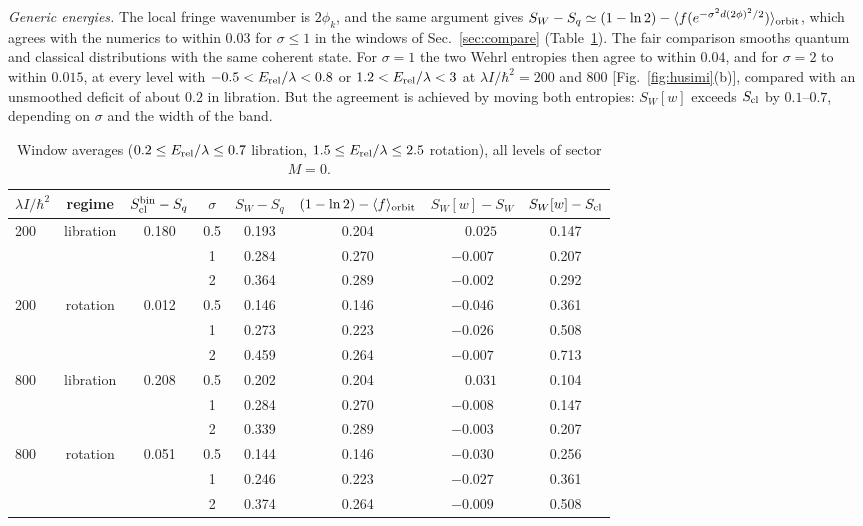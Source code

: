 \documentclass[pra,twocolumn,superscriptaddress,longbibliography,floatfix]{revtex4-2}
\newcommand{\Erel}{E_{\rm rel}}
\newcommand{\Scl}{S_{\rm cl}}
\newcommand{\SW}{S_{W}}
\begin{document}
\emph{Generic energies.} The local fringe wavenumber is $2\phi_{k}$, and the same
argument gives $\SW-S_{q}\simeq(1-\ln2)-\langle f(e^{-\sigma^{2}d(2\phi)^{2}/2})
\rangle_{\rm orbit}$, which agrees with the numerics to within $0.03$ for
$\sigma\le1$ in the windows of Sec.~\ref{sec:compare}
(Table~\ref{tab:husimi_gen}). The fair comparison smooths quantum and classical
distributions with the same coherent state. For $\sigma=1$ the two Wehrl entropies
then agree to within $0.04$, and for $\sigma=2$ to within $0.015$, at every level
with $-0.5<\Erel/\lambda<0.8$ or $1.2<\Erel/\lambda<3$ at
$\lambda I/\hbar^{2}=200$ and $800$ [Fig.~\ref{fig:husimi}(b)], compared with an
unsmoothed deficit of about $0.2$ in libration. But the agreement is achieved by
moving both entropies: $\SW[w]$ exceeds $\Scl$ by $0.1$--$0.7$, depending on
$\sigma$ and the width of the band.

\begin{table}[t]
\caption{Window averages ($0.2\le\Erel/\lambda\le0.7$ libration,
$1.5\le\Erel/\lambda\le2.5$ rotation), all levels of sector $M=0$.}
\label{tab:husimi_gen}
\small
\setlength{\tabcolsep}{6pt}
\begin{ruledtabular}
\begin{tabular}{lccccccc}
$\lambda I/\hbar^{2}$ & regime & $\Scl^{\rm bin}-S_{q}$ & $\sigma$ &
$\SW-S_{q}$ & $(1-\ln2)-\langle f\rangle_{\rm orbit}$ & $\SW[w]-\SW$ & $\SW[w]-\Scl$\\
\hline
200 & libration & 0.180 & 0.5 & 0.193 & 0.204 & $\phantom{-}0.025$ & 0.147\\
    &      &       & 1   & 0.284 & 0.270 & $-0.007$ & 0.207\\
    &      &       & 2   & 0.364 & 0.289 & $-0.002$ & 0.292\\
200 & rotation & 0.012 & 0.5 & 0.146 & 0.146 & $-0.046$ & 0.361\\
    &      &       & 1   & 0.273 & 0.223 & $-0.026$ & 0.508\\
    &      &       & 2   & 0.459 & 0.264 & $-0.007$ & 0.713\\
800 & libration & 0.208 & 0.5 & 0.202 & 0.204 & $\phantom{-}0.031$ & 0.104\\
    &      &       & 1   & 0.284 & 0.270 & $-0.008$ & 0.147\\
    &      &       & 2   & 0.339 & 0.289 & $-0.003$ & 0.207\\
800 & rotation & 0.051 & 0.5 & 0.144 & 0.146 & $-0.030$ & 0.256\\
    &      &       & 1   & 0.246 & 0.223 & $-0.027$ & 0.361\\
    &      &       & 2   & 0.374 & 0.264 & $-0.009$ & 0.508\\
\end{tabular}
\end{ruledtabular}
\end{table}
\end{document}
